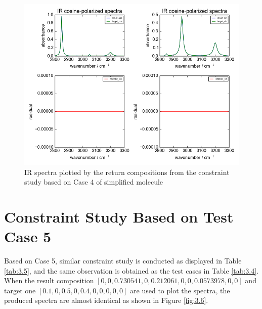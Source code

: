 \begin{figure}[!ht] 
\centering
\includegraphics[scale=0.7]{Figures/toy_model_result_plotting_ir_sin_4candi_constraint_study_experiment4.png} 
\caption{IR spectra plotted by the return compositions from the constraint study based on Case 4 of simplified molecule}\label{fig:3.5}
\end{figure}


\section{Constraint Study Based on Test Case 5}

Based on Case 5, similar constraint study is conducted as displayed in Table \ref{tab:3.5}, and the same observation is obtained as the test cases in Table \ref{tab:3.4}. When the result composition $[0, 0, 0.730541, 0, 0.212061,0, 0, 0.0573978, 0, 0]$ and target one $[0.1, 0, 0.5, 0, 0.4, 0, 0, 0, 0, 0]$ are used to plot the spectra, the produced spectra are almost identical as shown in Figure \ref{fig:3.6}.

